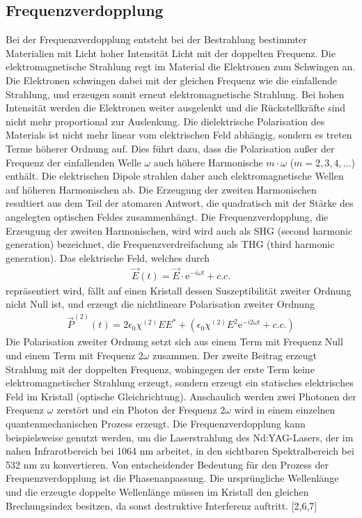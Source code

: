 \documentclass[twoside,colorback,accentcolor=tud4c,11pt]{tudreport}
\begin{document}
\subsection{Frequenzverdopplung}\label{freq}
Bei der Frequenzverdopplung entsteht bei der Bestrahlung bestimmter Materialien mit Licht hoher Intensität Licht mit der doppelten Frequenz. Die elektromagnetische Strahlung regt im Material die Elektronen zum Schwingen an. Die Elektronen schwingen dabei mit der gleichen Frequenz wie die einfallende Strahlung, und erzeugen somit erneut elektromagnetische Strahlung. Bei hohen Intensität werden die Elektronen weiter ausgelenkt und die Rückstellkräfte sind nicht mehr proportional zur Auslenkung. Die dielektrische Polarisation des Materials ist nicht mehr linear vom elektrischen Feld abhängig, sondern es treten Terme höherer Ordnung auf. Dies führt dazu, dass die Polarisation außer der Frequenz der einfallenden Welle $\omega$ auch höhere Harmonische $m\cdot \omega$ ($m=2,3,4,...$) enthält. Die elektrischen Dipole strahlen daher auch elektromagnetische Wellen auf höheren Harmonischen ab. Die Erzeugung der zweiten Harmonischen resultiert aus dem Teil der atomaren Antwort, die quadratisch mit der Stärke des angelegten optischen Feldes zusammenhängt. Die Frequenzverdopplung, die Erzeugung der zweiten Harmonischen, wird wird auch als SHG (second harmonic generation) bezeichnet, die Frequenzverdreifachung als THG (third harmonic generation). 
Das elektrische Feld, welches durch
\begin{align*}
\vec{E}(t)=\vec{E}\cdot\text{e}^{-i\omega t} + c.c.
\end{align*}
repräsentiert wird, fällt auf einen Kristall dessen Suszeptibilität zweiter Ordnung nicht Null ist, und erzeugt die nichtlineare Polarisation zweiter Ordnung
\begin{align*}
\vec{P}^{(2)}(t)=2\epsilon_0\chi^{(2)}EE^*+\left(\epsilon_0\chi^{(2)}E^2\text{e}^{-i2\omega t}+c.c.\right)
\end{align*} 
Die Polarisation zweiter Ordnung setzt sich aus einem Term mit Frequenz Null und einem Term mit Frequenz $2\omega$ zusammen. Der zweite Beitrag erzeugt Strahlung mit der doppelten Frequenz, wohingegen der erste Term keine elektromagnetischer Strahlung erzeugt, sondern erzeugt ein statisches elektrisches Feld im Kristall (optische Gleichrichtung).
Anschaulich werden zwei Photonen der Frequenz $\omega$ zerstört und ein Photon der Frequenz $2\omega$ wird in einem einzelnen quantenmechanischen Prozess erzeugt. Die Frequenzverdopplung kann beispielsweise genutzt werden, um die Laserstrahlung des Nd:YAG-Lasers, der im nahen Infrarotbereich bei 1064 nm arbeitet, in den sichtbaren Spektralbereich bei 532 nm zu konvertieren. Von entscheidender Bedeutung für den Prozess der Frequenzverdopplung ist die Phasenanpassung. Die ursprüngliche Wellenlänge und die erzeugte doppelte Wellenlänge müssen im Kristall den gleichen Brechungsindex besitzen, da sonst destruktive Interferenz auftritt.
[2,6,7]	
\end{document}
